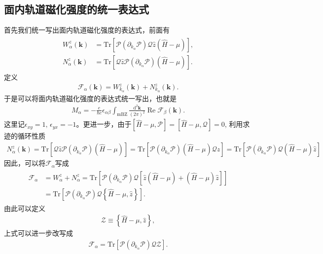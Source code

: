 \documentclass[10pt, oneside]{article}
\begin{document}
\subsection{面内轨道磁化强度的统一表达式}
首先我们统一写出面内轨道磁化强度的表达式，前面有
\begin{align}
	\begin{split}
		W^{z}_{\alpha} \left(\bm{k }\right) &= \mathrm{Tr} \left[\mathcal{P} \left(\partial_{k_{\alpha}} \mathcal{P}\right) \mathcal{Q} \hat{z} \left(\hat{H } - \mu\right)\right],\\
		N^{z}_{\alpha} \left(\bm{k }\right) & = \mathrm{Tr} \left[\mathcal{Q} \hat{z} \mathcal{P} \left(\partial_{k_{\alpha}} \mathcal{P}\right)\left(\hat{H} - \mu\right)\right] .
	\end{split}
\end{align}
定义
\begin{align}
	\mathcal{F}_{\alpha} \left(\bm{k }\right) = W^{z}_{k_{\alpha}} \left(\bm{k }\right) + N^{z}_{k_{\alpha}} \left(\bm{k }\right).
\end{align}
于是可以将面内轨道磁化强度的表达式统一写出，也就是
\begin{align}
	\boxed{
		M_{\alpha} = -\frac{e }{\hbar c } \epsilon_{\alpha \beta} \int_{\mathrm{mBZ }} \frac{\mathrm{d}^{2} \bm{k}}{\left(2 \pi\right)^2} \operatorname{Re} \mathcal{F}_{\beta} \left(\bm{k }\right).
	}
\end{align}
这里记\(\epsilon_{xy} = 1,\,\epsilon_{yx} = -1\)。更进一步，由于\(\left[\hat{H} - \mu, \mathcal{P}\right] = \left[\hat{H}-\mu, \mathcal{Q}\right] = 0\), 利用求迹的循环性质
\begin{align}
	N^{z}_{\alpha} \left(\bm{k }\right) = \mathrm{Tr} \left[\mathcal{Q} \hat{z} \mathcal{P} \left(\partial_{k_{\alpha}} \mathcal{P}\right)\left(\hat{H} - \mu\right)\right] =  \mathrm{Tr} \left[\mathcal{P} \left(\partial_{k_{\alpha}} \mathcal{P}\right)\left(\hat{H} - \mu\right) \mathcal{Q} \hat{z} \right] =  \mathrm{Tr} \left[\mathcal{P} \left(\partial_{k_{\alpha}} \mathcal{P}\right)  \mathcal{Q} \left(\hat{H} - \mu\right) \hat{z} \right] 
\end{align}
因此，可以将\(\mathcal{F}_{\alpha}\)写成
\begin{align}
	\begin{split}
		\mathcal{F}_{\alpha} &=  W^{z}_{\alpha} + N^{z}_{\alpha} = \mathrm{Tr} \left[\mathcal{P} \left(\partial_{k_{\alpha}} \mathcal{P} \right) \mathcal{Q} \left[\hat{z} \left(\hat{H} - \mu\right) +  \left(\hat{H} - \mu\right) \hat{z}\right]\right] \\
		& = \mathrm{Tr} \left[\mathcal{P} \left(\partial_{k_{\alpha}} \mathcal{P} \right) \mathcal{Q} \left\{\hat{H} - \mu, \hat{z}\right\}\right].
	\end{split}
\end{align}
由此可以定义
\begin{align}
	\mathcal{Z} \equiv \left\{\hat{H} - \mu, \hat{z}\right\},
\end{align}
上式可以进一步改写成
\begin{align}
	\boxed{
		\mathcal{F}_{\alpha} =  \mathrm{Tr} \left[\mathcal{P} \left(\partial_{k_{\alpha}} \mathcal{P} \right) \mathcal{Q} \mathcal{Z}\right].
	}
\end{align}
\end{document}
